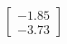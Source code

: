 \documentclass[preview]{standalone}
\begin{document}
\begin{align*}
\begin{bmatrix} -1.85 \\ -3.73 \end{bmatrix}
\end{align*}
\end{document}
